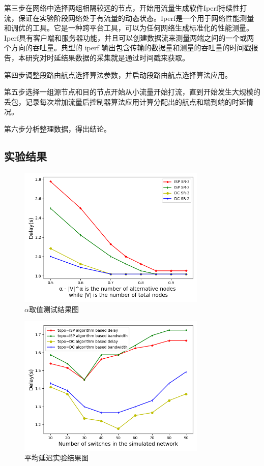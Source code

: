 第三步在网络中选择两组相隔较远的节点，开始用流量生成软件Iperf持续性打流，保证在实验阶段网络处于有流量的动态状态。Iperf是一个用于网络性能测量和调优的工具。它是一种跨平台工具，可以为任何网络生成标准化的性能测量。Iperf具有客户端和服务器功能，并且可以创建数据流来测量两端之间的一个或两个方向的吞吐量。典型的 iperf 输出包含传输的数据量和测量的吞吐量的时间戳报告，本研究对时延结果数据的采集就是通过时间戳来获取。

第四步调整段路由航点选择算法参数，并启动段路由航点选择算法应用。

第五步选择一组源节点和目的节点开始从小流量开始打流，直到开始发生大规模的丢包，记录每次增加流量后控制器算法应用计算分配出的航点和端到端的时延情况。

第六步分析整理数据，得出结论。

\subsection{实验结果}

\begin{figure}[htbp]
\setlength{\abovecaptionskip}{15pt plus 3pt minus 2pt}
\centerline{\includegraphics[width=0.8\textwidth]{./figures/ch3-test-1.png}}
\caption{$\alpha$取值测试结果图}
\label{fig-ch3-test-1}
\end{figure}

\begin{figure}[htbp]
\setlength{\abovecaptionskip}{15pt plus 3pt minus 2pt}
\centerline{\includegraphics[width=0.8\textwidth]{./figures/ch3-test-2.png}}
\caption{平均延迟实验结果图}
\label{fig-ch3-test-2}
\end{figure}

